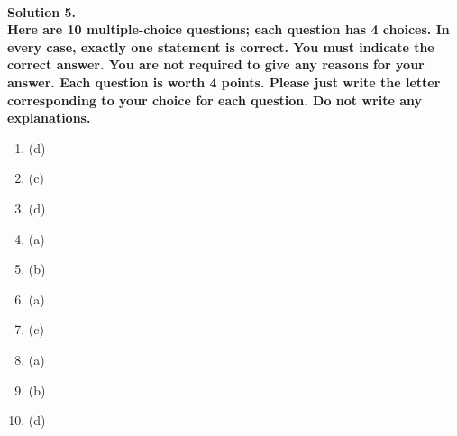 \documentclass{article}
\begin{document}
\\\noindent \textbf{Solution 5. 
\\Here are 10 multiple-choice questions; each question has 4 choices. In every case, exactly one statement is correct. You must indicate the correct answer. You are not required to give any reasons for your answer. Each question is worth 4 points. Please just write the letter corresponding to your choice for each question. Do not write any explanations.
}
\noindent 
\\\begin{enumerate}

    \item (d)
    
    \item (c)
        
    \item (d)
    
    \item (a)
    
    \item (b)
    
    \item (a)
    
    \item (c)
    
    \item (a)
    
    \item (b)
    
    \item(d)
    
\end{enumerate}
\\
\end{document}
